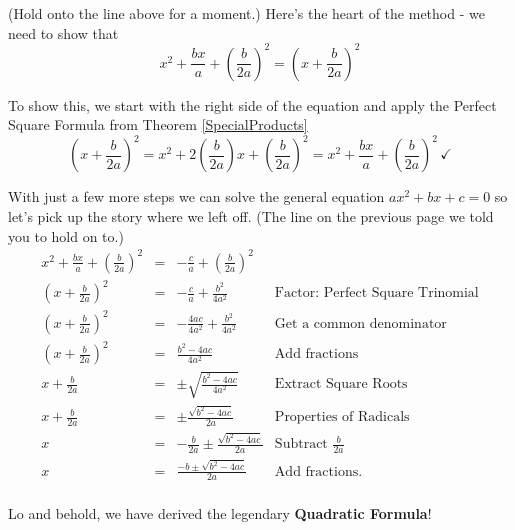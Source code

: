 \documentclass{ximera}
\begin{document}
(Hold onto the line above for a moment.)  Here's the heart of the method - we need to show that \[ x^2 + \frac{bx}{a} + \left(\frac{b}{2a}\right)^2 = \left(x + \frac{b}{2a}\right)^2 \]

To show this, we start with the right side of the equation and apply the Perfect Square Formula from Theorem \ref{SpecialProducts} \[ \left(x + \frac{b}{2a}\right)^2 = x^2 + 2\left(\frac{b}{2a}\right)x + \left(\frac{b}{2a}\right)^2 = x^2 + \frac{bx}{a} + \left(\frac{b}{2a}\right)^2 \, \checkmark \]

With just a few more steps we can solve the general equation $ax^{2} + bx + c = 0$ so let's pick up the story where we left off. (The line on the previous page we told you to hold on to.)\[ \begin{array}{rclr}

x^2 + \frac{bx}{a} + \left(\frac{b}{2a}\right)^2 & = & -\frac{c}{a} + \left(\frac{b}{2a}\right)^2 & \\  
\left(x + \frac{b}{2a}\right)^2 & = & -\frac{c}{a} + \frac{b^2}{4a^2} & \text{Factor: Perfect Square Trinomial} \\  

\left(x + \frac{b}{2a}\right)^2 & = & -\frac{4ac}{4a^2} + \frac{b^2}{4a^2} & \text{Get a common denominator}\\

\left(x + \frac{b}{2a}\right)^2 & = & \frac{b^2 - 4ac}{4a^2} & \text{Add fractions}\\  

x + \frac{b}{2a} & = & \pm \sqrt{\frac{b^2 - 4ac}{4a^2}} & \text{Extract Square Roots} \\  

x + \frac{b}{2a} & = & \pm \frac{\sqrt{b^2 - 4ac}}{2a} & \text{Properties of Radicals} \\  

x  & = & - \frac{b}{2a} \pm \frac{\sqrt{b^2 - 4ac}}{2a} & \text{Subtract $\frac{b}{2a}$} \\  

x  & = & \frac{-b \pm \sqrt{b^2 - 4ac}}{2a} & \text{Add fractions.} \\

\end{array}\]

Lo and behold, we have derived the legendary \textbf{Quadratic Formula}!

 

\end{document}
